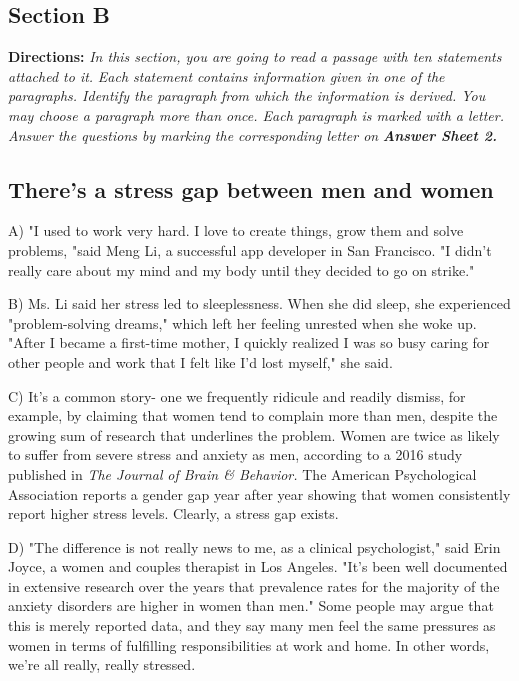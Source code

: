 \documentclass[UTF8,11pt]{ctexart}
\begin{document}
\subsection*{\textbf{Section B}}


\textbf{Directions: }\textit{In this section, you are going to read a passage with ten statements attached to it.} \textit{Each statement contains information given in one of the paragraphs. Identify the paragraph} \textit{from which the information is derived. You may choose a paragraph more than once. Each} \textit{paragraph is marked with a letter. Answer the questions by marking the corresponding letter on} \textbf{\textit{Answer Sheet 2.}}


\subsection*{\textbf{There's a stress gap between men and women}}


A) "I used to work very hard. I love to create things, grow them and solve problems, "said Meng Li, a successful app developer in San Francisco. "I didn't really care about my mind and my body until they decided to go on strike."


B) Ms. Li said her stress led to sleeplessness. When she did sleep, she experienced "problem-solving dreams," which left her feeling unrested when she woke up. "After I became a first-time mother, I quickly realized I was so busy caring for other people and work that I felt like I'd lost myself," she said.


C) It's a common story- one we frequently ridicule and readily dismiss, for example, by claiming that women tend to complain more than men, despite the growing sum of research that underlines the problem. Women are twice as likely to suffer from severe stress and anxiety as men, according to a 2016 study published in \textit{The Journal} \textit{of Brain \& Behavior. }The American Psychological Association reports a gender gap year after year showing that women consistently report higher stress levels. Clearly, a stress gap exists.


D) "The difference is not really news to me, as a clinical psychologist," said Erin Joyce, a women and couples therapist in Los Angeles. "It's been well documented in extensive research over the years that prevalence rates for the majority of the anxiety disorders are higher in women than men." Some people may argue that this is merely reported data, and they say many men feel the same pressures as women in terms of fulfilling responsibilities at work and home. In other words, we're all really, really stressed.
\end{document}
